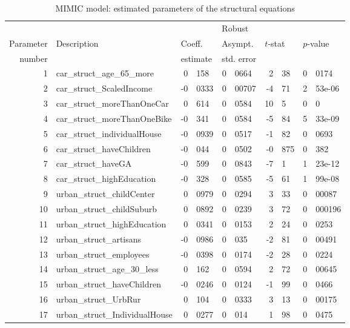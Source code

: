 \documentclass[12pt,a4paper]{article}
\begin{document}
\begin{table}[htb]
    \footnotesize
  \begin{center}
\begin{tabular}{rlr@{.}lr@{.}lr@{.}lr@{.}l}
  &              &   \multicolumn{2}{l}{}         & \multicolumn{2}{l}{Robust}  &  \multicolumn{4}{l}{}  \\
  Parameter & Description & \multicolumn{2}{l}{Coeff.} & \multicolumn{2}{l}{Asympt.} & \multicolumn{2}{l}{$t$-stat} & \multicolumn{2}{l}{$p$-value} \\
  number    &             & \multicolumn{2}{l}{estimate} & \multicolumn{2}{l}{std. error} & \multicolumn{2}{l}{} & \multicolumn{2}{l}{} \\
  \hline
1 & car\_struct\_age\_65\_more & 0&158 & 0&0664 & 2&38 & 0&0174 \\ 
2 & car\_struct\_ScaledIncome & -0&0333 & 0&00707 & -4&71 & 2&53e-06 \\ 
3 & car\_struct\_moreThanOneCar & 0&614 & 0&0584 & 10&5 & 0&0 \\ 
4 & car\_struct\_moreThanOneBike & -0&341 & 0&0584 & -5&84 & 5&33e-09 \\ 
5 & car\_struct\_individualHouse & -0&0939 & 0&0517 & -1&82 & 0&0693 \\ 
6 & car\_struct\_haveChildren & -0&044 & 0&0502 & -0&875 & 0&382 \\ 
7 & car\_struct\_haveGA & -0&599 & 0&0843 & -7&1 & 1&23e-12 \\ 
8 & car\_struct\_highEducation & -0&328 & 0&0585 & -5&61 & 1&99e-08 \\ 
9 & urban\_struct\_childCenter & 0&0979 & 0&0294 & 3&33 & 0&00087 \\ 
10 & urban\_struct\_childSuburb & 0&0892 & 0&0239 & 3&72 & 0&000196 \\ 
11 & urban\_struct\_highEducation & 0&0341 & 0&0153 & 2&24 & 0&0253 \\ 
12 & urban\_struct\_artisans & -0&0986 & 0&035 & -2&81 & 0&00491 \\ 
13 & urban\_struct\_employees & -0&0398 & 0&0174 & -2&28 & 0&0224 \\ 
14 & urban\_struct\_age\_30\_less & 0&162 & 0&0594 & 2&72 & 0&00645 \\ 
15 & urban\_struct\_haveChildren & -0&0246 & 0&0124 & -1&99 & 0&0466 \\ 
16 & urban\_struct\_UrbRur & 0&104 & 0&0333 & 3&13 & 0&00175 \\ 
17 & urban\_struct\_IndividualHouse & 0&0277 & 0&014 & 1&98 & 0&0475 \\ 
\end{tabular}
\caption{MIMIC model: estimated parameters of the structural equations\label{tab:mimic_params_struct}}
  \end{center}
\end{table}
\end{document}
